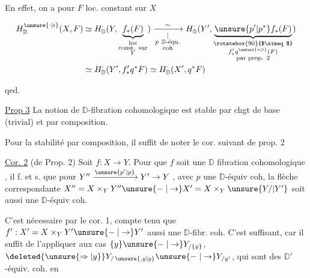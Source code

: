 
En effet, on a pour $F$ loc. constant sur $X$

\[
\begin{aligned}
H^{\unsure{\cdot|i}}_{\mathbb D}(X,F)&\simeq H^{\cdot}_{\mathbb D}(Y,\underbrace{f_*(F)}_{\substack{\text{loc}\\\text{const. sur}\\Y}})
\xrightarrow[\substack{|\\ p\ \mathbb D\text{-équ.}\\\text{coh}}]{\sim}
H^{\cdot}_{\mathbb D}(Y',\underbrace{\unsure{p'|p^*}f_*(F)}_{\substack{\rotatebox{90}{$\simeq$}\\ f'_*q^{\unsure{*|\prime}}(F)\\\text{par prop. 2}}})\\
&\simeq H^{\cdot}_{\mathbb D}(Y',f'_*q^*F)\simeq H^{\cdot}_{\mathbb D}(X',q^*F)
\end{aligned}
\]

qed.

\uline{Prop 3} La notion de $\mathbb D$-fibration cohomologique  est stable par chgt de base (trivial) et par composition.

 Pour la stabilité par composition, il suffit de  noter le cor. suivant de prop. 2

\uline{Cor. 2} (de Prop. 2) Soit $f:X\to Y$. Pour que $f$ soit une $\mathbb D$ fibration cohomologique , il f. et s. que pour $Y''\xrightarrow{\unsure{p'|p}}Y'\to Y$ , avec $p$ une $\mathbb D$-équiv coh, la flèche correspondante $X''=X\times_Y Y''\unsure{\relbar|\to}X'=X\times_Y\unsure{Y/|Y'}$ soit aussi une $\mathbb D$-équiv coh.

C'est nécessaire par le cor. 1, compte tenu que $f':X'=X\times_Y Y'\unsure{\relbar|\to}Y'$  aussi une $\mathbb D$-fibr. coh. C'est suffisant, car il suffit de l'appliquer aux cas $\{y\}\unsure{\relbar|\to}Y_{/\{y\}}$, $\deleted{\unsure{\Rightarrow|y}}Y_{/\,\unsure{,y|y}}\unsure{\relbar|\to}Y_{/y'}$, qui sont des $\mathbb D'$-équiv. coh. en


